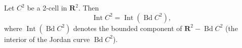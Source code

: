 Let $C^2$ be a 2-cell in $\mathbf{R}^2$. Then
$$\operatorname{Int} C^2 = \operatorname{Int} (\operatorname{Bd} C^2),$$
where $\operatorname{Int} (\operatorname{Bd} C^2)$ denotes the bounded component of $\mathbf{R}^2 - \operatorname{Bd} C^2$ (the interior of the Jordan curve $\operatorname{Bd} C^2$).
